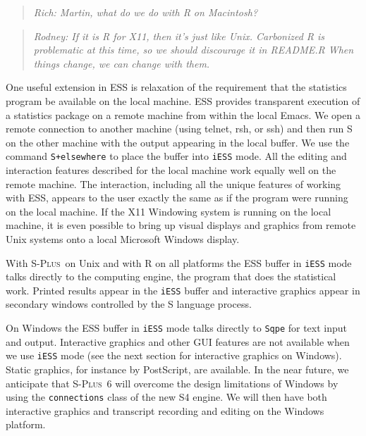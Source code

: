 \documentclass{article}
\newcommand*{\Splus}{\textsc{S-Plus}}
\newcommand{\stexttt}[1]{{\small\texttt{#1}}}
\newenvironment{Comment}{\begin{quote}\small\itshape }{\end{quote}}
\begin{document}
\begin{Comment} Rich: Martin, what do we do with R on Macintosh?\end{Comment}
\begin{Comment} Rodney: If it is R for X11, then it's just like Unix.  
Carbonized R is problematic at this time, so we should discourage it in 
README.R  When things change, we can change with them.\end{Comment}

One useful extension in ESS is relaxation of the requirement that the
statistics program be available on the local machine.  ESS provides
transparent execution of a statistics package on a remote machine from
within the local Emacs.  We open a remote connection to another
machine (using telnet, rsh, or ssh) and then run S on the other
machine with the output appearing in the local buffer.  We use the
command \stexttt{S+elsewhere} to place the buffer into \stexttt{iESS}
mode.
All the editing and interaction features described for the local
machine work equally well on the remote machine.  The interaction,
including all the unique features of working with ESS, appears to the
user exactly the same as if the program were running on the local
machine.  If the X11 Windowing system is running on the local machine,
it is even possible to bring up visual displays and graphics from
remote Unix systems onto a local Microsoft Windows display.

With \Splus\ on Unix and with R on all platforms the ESS buffer in
\stexttt{iESS} mode talks directly to the computing engine, the
program that does the statistical work.  Printed results appear in the
\stexttt{iESS} buffer and interactive graphics appear in secondary
windows controlled by the S language process.

On Windows the ESS buffer in \stexttt{iESS} mode talks directly to
\stexttt{Sqpe} for text input and output.  Interactive graphics and
other GUI features are not available when we use \stexttt{iESS} mode
(see the next section for interactive graphics on Windows).
Static graphics, for instance by PostScript, are available.  In the
near future, we anticipate that \Splus\ 6 will overcome the design
limitations of Windows by using the \stexttt{connections} class of the
new S4 engine.  We will then have both interactive graphics and transcript
recording and editing on the Windows platform.
\end{document}
